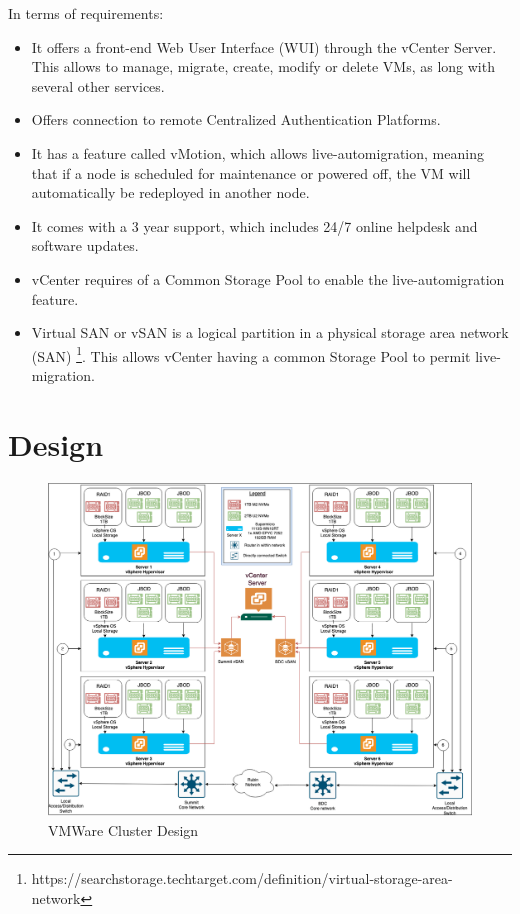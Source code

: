 In terms of requirements:
\begin{itemize}
  \item It offers a front-end Web User Interface (WUI) through the vCenter Server. This allows to manage, migrate, create, modify or delete VMs, as long with several other services.
  \item Offers connection to remote Centralized Authentication Platforms.
  \item It has a feature called vMotion, which allows live-automigration, meaning that if a node is scheduled for maintenance or powered off, the VM will automatically be redeployed in another node.
  \item It comes with a 3 year support, which includes 24/7 online helpdesk and software updates.
  \item vCenter requires of a Common Storage Pool to enable the live-automigration feature.
  \item Virtual SAN or vSAN is a logical partition in a physical storage area network (SAN) \footnote{https://searchstorage.techtarget.com/definition/virtual-storage-area-network}. This allows vCenter having a common Storage Pool to permit live-migration.
\end{itemize}

\newpage
\section{Design}

\begin{figure}
  \includegraphics[width=12cm]{images/vmware_cluster_design.png}
  \centering
  \caption{VMWare Cluster Design}
\end{figure}


